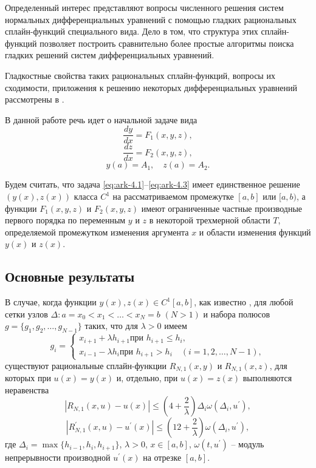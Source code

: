 Определенный интерес представляют вопросы численного решения систем нормальных 
дифференциальных уравнений с помощью гладких рациональных сплайн-функций специального 
вида. Дело в том, что структура этих сплайн-функций позволяет построить сравнительно 
более простые алгоритмы поиска гладких решений систем дифференциальных уравнений.

Гладкостные свойства таких рациональных сплайн-функций, вопросы их сходимости, 
приложения к решению некоторых 
дифференциальных уравнений рассмотрены в \cite{bib:ark-11,bib:ark-12,bib:ark-13}.

В данной работе речь идет о начальной задаче вида 
\begin{equation}\label{eq:ark-4.1}
\frac{dy}{dx}=F_1(x,y,z),
\end{equation}
\begin{equation}\label{eq:ark-4.2}
\frac{dz}{dx}=F_2(x,y,z),
\end{equation}
\begin{equation}\label{eq:ark-4.3}
y(a)=A_1,\quad z(a)=A_2.
\end{equation}

Будем считать, что задача \eqref{eq:ark-4.1}--\eqref{eq:ark-4.3} имеет единственное решение
$(y(x), z(x))$ класса $C^1$ на рассматриваемом промежутке $[a,b]$ или
$[a,b)$, а функции $F_1(x,y,z)$ и $F_2(x,y,z)$ имеют ограниченные частные
 производные первого порядка по переменным $y$ и $z$ в некоторой трехмерной 
области $T$, определяемой промежутком изменения аргумента $x$ и области 
изменения функций $y(x)$ и $z(x)$.
                         
\subsection{Основные результаты}

В случае, когда функции  $y(x), z(x)\in C^1[a,b]$, как известно \cite{bib:ark-11},
 для любой сетки узлов $\Delta: a=x_0<x_1<\dots<x_N=b$  $(N>1)$ и 
набора полюсов $g=\{g_1, g_2,\dots, g_{N-1}\}$ таких, что для  $\lambda>0$ имеем
$$
g_i=\begin{cases}
x_{i+1}+\lambda h_{i+1} \text{при } h_{i+1}\leqslant h_i,\\
x_{i-1}-\lambda h_i \text{при } h_{i+1}> h_i \quad (i=1,2,\dots,N-1),
\end{cases}
$$
существуют рациональные сплайн-функции $R_{N,1}(x,y)$ и $R_{N,1}(x,z)$,
 для которых при $u(x)=y(x)$ и, отдельно, при $u(x)=z(x)$ выполняются неравенства
\begin{equation}\label{eq:ark-4.4}
|R_{N,1}(x,u)-u(x)|\leqslant
\left(4+\frac 2\lambda \right)\Delta_i \omega(\Delta_i,u^\prime),
\end{equation}
\begin{equation}\label{eq:ark-4.5}
|R^\prime_{N,1}(x,u)-u^\prime(x)|\leqslant 
\left(12+\frac 2\lambda \right)\omega(\Delta_i,u^\prime),
\end{equation}
где $\Delta_i=\max\{h_{i-1}, h_i, h_{i+1}\}$, $\lambda >0$, $x\in [a,b]$, $\omega(t, u^\prime)$
-- модуль непрерывности производной $u^\prime (x)$ на отрезке $[a,b]$.

